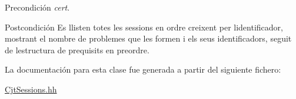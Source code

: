 \begin{DoxyPrecond}{Precondición}
{\itshape cert}. 
\end{DoxyPrecond}
\begin{DoxyPostcond}{Postcondición}
Es llisten totes les sessions en ordre creixent per l\textquotesingle{}identificador, mostrant el nombre de problemes que les formen i els seus identificadors, seguit de l\textquotesingle{}estructura de prequisits en preordre. 
\end{DoxyPostcond}


La documentación para esta clase fue generada a partir del siguiente fichero\+:\begin{DoxyCompactItemize}
\item 
\mbox{\hyperlink{_cjt_sessions_8hh}{Cjt\+Sessions.\+hh}}\end{DoxyCompactItemize}

